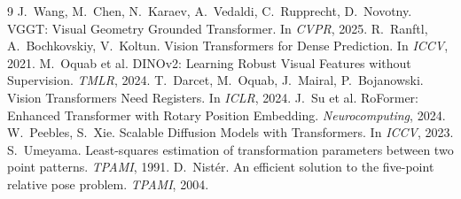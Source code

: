 \documentclass[11pt,a4paper]{article}
\begin{document}
\begin{thebibliography}{9}
 J.~Wang, M.~Chen, N.~Karaev, A.~Vedaldi, C.~Rupprecht, D.~Novotny.
  VGGT: Visual Geometry Grounded Transformer. In \emph{CVPR}, 2025.
 R.~Ranftl, A.~Bochkovskiy, V.~Koltun. Vision Transformers for Dense Prediction. In \emph{ICCV}, 2021.
 M.~Oquab et al. DINOv2: Learning Robust Visual Features without Supervision. \emph{TMLR}, 2024.
 T.~Darcet, M.~Oquab, J.~Mairal, P.~Bojanowski. Vision Transformers Need Registers. In \emph{ICLR}, 2024.
 J.~Su et al. RoFormer: Enhanced Transformer with Rotary Position Embedding. \emph{Neurocomputing}, 2024.
 W.~Peebles, S.~Xie. Scalable Diffusion Models with Transformers. In \emph{ICCV}, 2023.
 S.~Umeyama. Least-squares estimation of transformation parameters between two point patterns. \emph{TPAMI}, 1991.
 D.~Nist\'er. An efficient solution to the five-point relative pose problem. \emph{TPAMI}, 2004.
\end{thebibliography}
\end{document}
